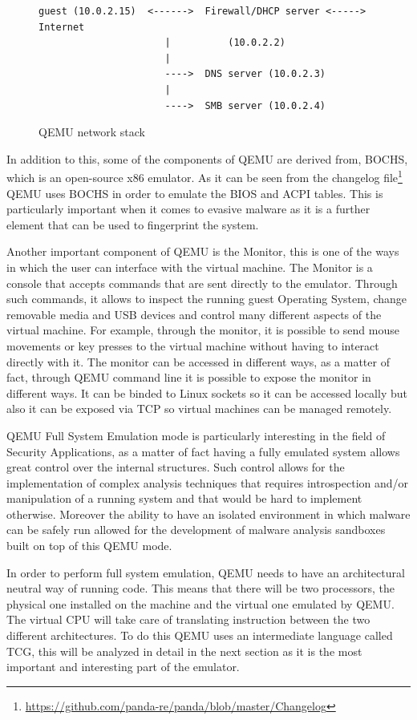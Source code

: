 \begin{figure}[htp]
\centering
\begin{lstlisting}
guest (10.0.2.15)  <------>  Firewall/DHCP server <-----> Internet
                      |          (10.0.2.2)
                      |
                      ---->  DNS server (10.0.2.3)
                      |
                      ---->  SMB server (10.0.2.4)
\end{lstlisting}
\caption{QEMU network stack}
\label{fig:qemunet}
\end{figure}

In addition to this, some of the components of QEMU are derived from, BOCHS, which is an open-source x86 emulator. As it can be seen from the changelog file\footnote{\url{https://github.com/panda-re/panda/blob/master/Changelog}} QEMU uses BOCHS in order to emulate the BIOS and ACPI tables. This is particularly important when it comes to evasive malware as it is a further element that can be used to fingerprint the system.

Another important component of QEMU is the Monitor, this is one of the ways in which the user can interface with the virtual machine. The Monitor is a console that accepts commands that are sent directly to the emulator. Through such commands, it allows to inspect the running guest Operating System, change removable media and USB devices and control many different aspects of the virtual machine. For example, through the monitor, it is possible to send mouse movements or key presses to the virtual machine without having to interact directly with it. The monitor can be accessed in different ways, as a matter of fact, through QEMU command line it is possible to expose the monitor in different ways. It can be binded to Linux sockets so it can be accessed locally but also it can be exposed via TCP so virtual machines can be managed remotely.

QEMU Full System Emulation mode is particularly interesting in the field of Security Applications, as a matter of fact having a fully emulated system allows great control over the internal structures. Such control allows for the implementation of complex analysis techniques that requires introspection and/or manipulation of a running system and that would be hard to implement otherwise. Moreover the ability to have an isolated environment in which malware can be safely run allowed for the development of malware analysis sandboxes built on top of this QEMU mode. 

In order to perform full system emulation, QEMU needs to have an architectural neutral way of running code. This means that there will be two processors, the physical one installed on the machine and the virtual one emulated by QEMU. The virtual CPU will take care of translating instruction between the two different architectures. To do this QEMU uses an intermediate language called TCG, this will be analyzed in detail in the next section as it is the most important and interesting part of the emulator.


